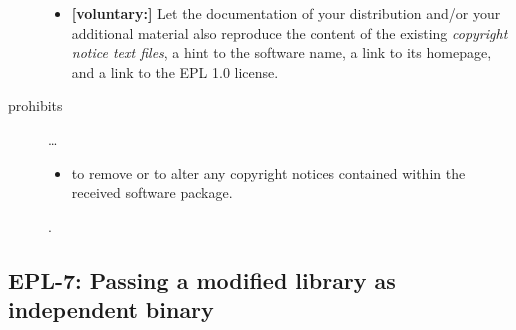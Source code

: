 \begin{description}
\begin{itemize}
  \item \textbf{[voluntary:]} Let the documentation of your distribution and/or
  your additional material  also reproduce the content of the existing
  \emph{copyright notice text files}, a hint to the software name, a link to its
  homepage, and a link to the EPL 1.0 license.

\end{itemize}

\item[prohibits] \ldots
\begin{itemize}
  \item to remove or to alter any copyright notices contained within the
  received software package.
\end{itemize}.

\end{description}


\subsection{EPL-7: Passing a modified library as independent binary}

